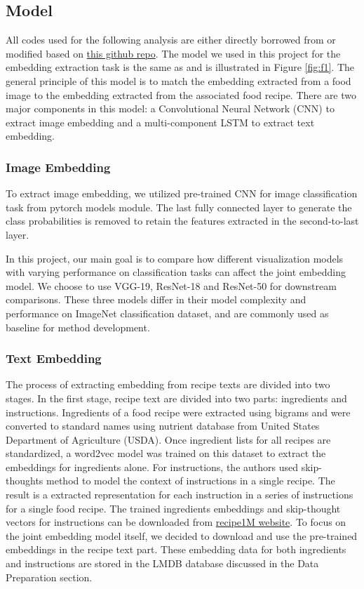 \documentclass[10pt,twocolumn,letterpaper]{article}
\begin{document}
\subsection{Model}
All codes used for the following analysis are either directly borrowed from or modified based on \href{https://github.com/torralba-lab/im2recipe-Pytorch}{this github repo}.  The model we used in this project for the embedding extraction task is the same as \cite{marin2019learning} and is illustrated in Figure \ref{fig:f1}.  The general principle of this model is to match the embedding extracted from a food image to the embedding extracted from the associated food recipe.  There are two major components in this model: a Convolutional Neural Network (CNN) to extract image embedding and a multi-component LSTM to extract text embedding.

\subsubsection{Image Embedding}
To extract image embedding, we utilized pre-trained CNN for image classification task from pytorch models module.  The last fully connected layer to generate the class probabilities is removed to retain the features extracted in the second-to-last layer.

In this project, our main goal is to compare how different visualization models with varying performance on classification tasks can affect the joint embedding model.  We choose to use VGG-19, ResNet-18 and ResNet-50 for downstream comparisons.  These three models differ in their model complexity and performance on ImageNet classification dataset, and are commonly used as baseline for method development.

\subsubsection{Text Embedding}
The process of extracting embedding from recipe texts are divided into two stages.  In the first stage, recipe text are divided into two parts: ingredients and instructions.  Ingredients of a food recipe were extracted using bigrams and were converted to standard names using nutrient database from United States Department of Agriculture (USDA).  Once ingredient lists for all recipes are standardized, a word2vec model was trained on this dataset to extract the embeddings for ingredients alone.  For instructions, the authors used skip-thoughts method \cite{NIPS2015_f442d33f} to model the context of instructions in a single recipe.  The result is a extracted representation for each instruction in a series of instructions for a single food recipe.  The trained ingredients embeddings and skip-thought vectors for instructions can be downloaded from \href{http://im2recipe.csail.mit.edu/dataset/download/}{recipe1M website}.  To focus on the joint embedding model itself, we decided to download and use the pre-trained embeddings in the recipe text part.  These embedding data for both ingredients and instructions are stored in the LMDB database discussed in the Data Preparation section.
\end{document}
